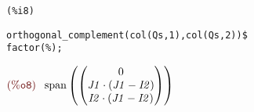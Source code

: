 \noindent
\begin{minipage}[t]{8ex}\color{red}\bf
\begin{verbatim}
(%i8) 
\end{verbatim}
\end{minipage}
\begin{minipage}[t]{\textwidth}\color{blue}
\begin{verbatim}
orthogonal_complement(col(Qs,1),col(Qs,2))$
factor(%);
\end{verbatim}
\end{minipage}

\noindent
\begin{math}\displaystyle
\parbox{8ex}{$\color{labelcolor}\mathrm{\tt (\%o8) }\quad $}
\mathrm{span}\left( \begin{pmatrix}0\cr \mathit{J1}\cdot \left( \mathit{J1}-\mathit{I2}\right) \cr \mathit{I2}\cdot \left( \mathit{J1}-\mathit{I2}\right) \end{pmatrix}\right) \mbox{}
\end{math}

